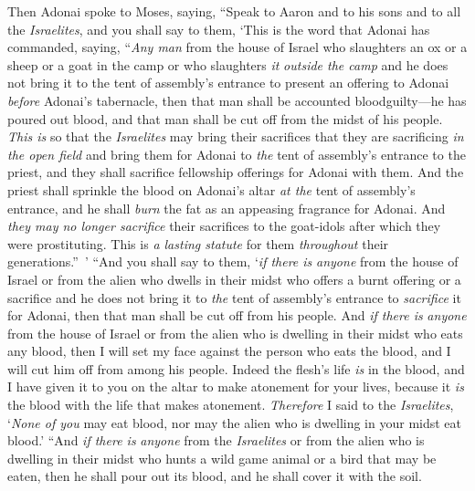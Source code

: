 \begin{biblechapter} %
 Then Adonai spoke to Moses, saying,
\verse “Speak to Aaron and to his sons and to all the \textit{Israelites}, and you shall say to them, ‘This is the word that Adonai has commanded, saying,
\verse “\textit{Any man} from the house of Israel who slaughters an ox or a sheep or a goat in the camp or who slaughters \textit{it} \textit{outside the camp}
\verse and he does not bring it to the tent of assembly’s entrance to present an offering to Adonai \textit{before} Adonai’s tabernacle, then that man shall be accounted bloodguilty—he has poured out blood, and that man shall be cut off from the midst of his people.
\verse \textit{This is} so that the \textit{Israelites} may bring their sacrifices that they are sacrificing \textit{in the open field} and bring them for Adonai to \textit{the} tent of assembly’s entrance to the priest, and they shall sacrifice fellowship offerings for Adonai with them.
\verse And the priest shall sprinkle the blood on Adonai’s altar \textit{at the} tent of assembly’s entrance, and he shall \textit{burn} the fat as an appeasing fragrance for Adonai.
\verse And \textit{they may no longer sacrifice} their sacrifices to the goat-idols after which they were prostituting. This is \textit{a lasting statute} for them \textit{throughout} their generations.” ’
 “And you shall say to them, ‘\textit{if there is} \textit{anyone} from the house of Israel or from the alien who dwells in their midst who offers a burnt offering or a sacrifice
\verse and he does not bring it to \textit{the} tent of assembly’s entrance to \textit{sacrifice} it for Adonai, then that man shall be cut off from his people.
\verse And \textit{if there is} \textit{anyone} from the house of Israel or from the alien who is dwelling in their midst who eats any blood, then I will set my face against the person who eats the blood, and I will cut him off from among his people.
\verse Indeed the flesh’s life \textit{is} in the blood, and I have given it to you on the altar to make atonement for your lives, because it \textit{is} the blood with the life that makes atonement.
\verse \textit{Therefore} I said to the \textit{Israelites}, ‘\textit{None of you} may eat blood, nor may the alien who is dwelling in your midst eat blood.’
\verse “And \textit{if there is} \textit{anyone} from the \textit{Israelites} or from the alien who is dwelling in their midst who hunts a wild game animal or a bird that may be eaten, then he shall pour out its blood, and he shall cover it with the soil.

\end{biblechapter}
